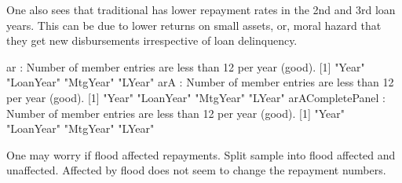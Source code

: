 One also sees that \textsf{traditional} has lower repayment rates in the 2nd and 3rd loan years. This can be due to lower returns on small assets, or, moral hazard that they get new disbursements irrespective of loan delinquency. 
\begin{Schunk}
\begin{Soutput}
ar : Number of member entries are less than 12 per year (good).
[1] "Year"     "LoanYear" "MtgYear"  "LYear"   
arA : Number of member entries are less than 12 per year (good).
[1] "Year"     "LoanYear" "MtgYear"  "LYear"   
arACompletePanel : Number of member entries are less than 12 per year (good).
[1] "Year"     "LoanYear" "MtgYear"  "LYear"   
\end{Soutput}
\end{Schunk}
One may worry if flood affected repayments. Split sample into flood affected and unaffected. Affected by flood does not seem to change the repayment numbers.
